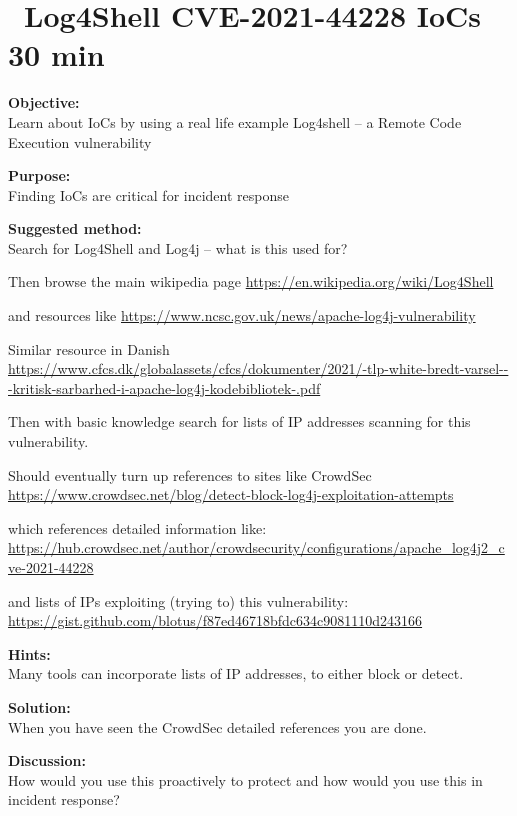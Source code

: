\documentclass[a4paper,11pt,notitlepage]{report}
\begin{document}
\chapter{\faExclamationTriangle\ Log4Shell CVE-2021-44228 IoCs 30 min}
\label{ex:log4shell-iocs}


{\bf Objective:}\\
Learn about IoCs by using a real life example Log4shell -- a Remote Code Execution vulnerability

{\bf Purpose:}\\
Finding IoCs are critical for incident response


{\bf Suggested method:}\\
Search for Log4Shell and Log4j -- what is this used for?

Then browse the main wikipedia page \url{https://en.wikipedia.org/wiki/Log4Shell}

and resources like \url{https://www.ncsc.gov.uk/news/apache-log4j-vulnerability}

Similar resource in Danish\\
 \url{https://www.cfcs.dk/globalassets/cfcs/dokumenter/2021/-tlp-white-bredt-varsel---kritisk-sarbarhed-i-apache-log4j-kodebibliotek-.pdf}

Then with basic knowledge search for lists of IP addresses scanning for this vulnerability.

Should eventually turn up references to sites like CrowdSec\\
\url{https://www.crowdsec.net/blog/detect-block-log4j-exploitation-attempts}

which references detailed information like:\\
\url{https://hub.crowdsec.net/author/crowdsecurity/configurations/apache_log4j2_cve-2021-44228}

and lists of IPs exploiting (trying to) this vulnerability:\\
\url{https://gist.github.com/blotus/f87ed46718bfdc634c9081110d243166}

{\bf Hints:}\\
Many tools can incorporate lists of IP addresses, to either block or detect.

{\bf Solution:}\\
When you have seen the CrowdSec detailed references you are done.

{\bf Discussion:}\\
How would you use this proactively to protect and how would you use this in incident response?
\end{document}
